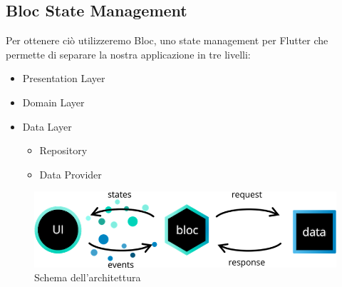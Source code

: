 \subsection{Bloc State Management}
Per ottenere ciò utilizzeremo Bloc, uno state management per Flutter che permette di separare la nostra applicazione in tre livelli:
\begin{itemize}
    \item Presentation Layer
    \item Domain Layer
    \item Data Layer
    \begin{itemize}
        \item Repository
        \item Data Provider
    \end{itemize}
\end{itemize}
\begin{figure}[h]
    \centering
    \includegraphics[scale=.5]{immagini/blocarchitecture.png}
    \caption{Schema dell'architettura}
    \label{fig:my_label}
\end{figure}
\newpage
